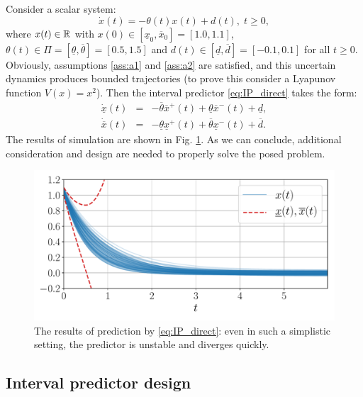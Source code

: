 \begin{example*}
	[motivating] Consider a scalar system:
	\[
	\dot{x}(t)=-\theta(t)x(t)+d(t),\;t\geq0,
	\]
	where $x(t)\in\mathbb{R}$ with $x(0)\in[\underline{x}_{0},\overline{x}_{0}]=[1.0, 1.1]$, $\theta(t)\in\Pi=[\underline{\theta},\overline{\theta}]=[0.5,1.5]$ and $d(t)\in[\underline{d},\overline{d}]=[-0.1,0.1]$ for all $t\geq0$. Obviously, assumptions \ref{ass:a1} and \ref{ass:a2} are satisfied, and this uncertain dynamics produces bounded trajectories (to prove this consider a Lyapunov function $V(x)=x^{2}$). Then the interval predictor \eqref{eq:IP_direct} takes the form:
	\begin{eqnarray*}
		\dot{\underline{x}}(t) & = & -\overline{\theta}\overline{x}^{+}(t)+\underline{\theta}\overline{x}^{-}(t)+\underline{d},\\
		\dot{\overline{x}}(t) & = & -\underline{\theta}\underline{x}^{+}(t)+\overline{\theta}\underline{x}^{-}(t)+\overline{d}.
	\end{eqnarray*}
	The results of simulation are shown in Fig. \ref{fig:IP_Direct}. As we can conclude, additional consideration and design are needed to properly solve the posed problem.
	\begin{figure}
		\begin{centering}
			\includegraphics[width=\linewidth]{img/observer}
			\par\end{centering}
		\caption{\label{fig:IP_Direct} The results of prediction by \eqref{eq:IP_direct}: even in such a simplistic setting, the predictor is unstable and diverges quickly.}
	\end{figure}
\end{example*}

\subsection{\label{sec:Main-results} Interval predictor design}

